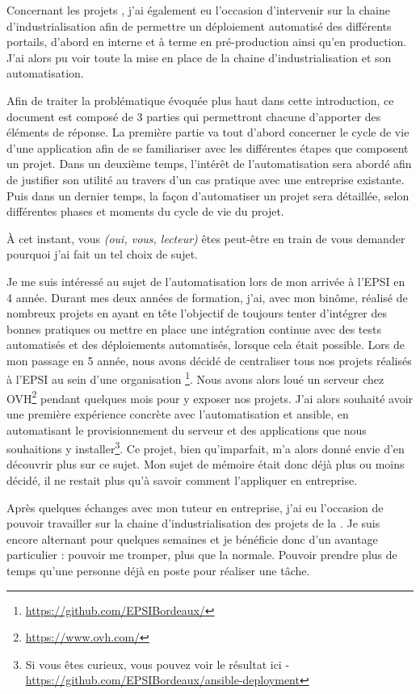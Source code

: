Concernant les projets \naq, j'ai également eu l'occasion d'intervenir sur la chaine d'industrialisation afin de permettre un déploiement automatisé des différents portails, d'abord en interne et à terme en pré-production ainsi qu'en production. J'ai alors pu voir toute la mise en place de la chaine d'industrialisation et son automatisation.

Afin de traiter la problématique évoquée plus haut dans cette introduction, ce document est composé de 3 parties qui permettront chacune d'apporter des éléments de réponse. La première partie va tout d'abord concerner le cycle de vie d'une application afin de se familiariser avec les différentes étapes que composent un projet. Dans un deuxième temps, l'intérêt de l'automatisation sera abordé afin de justifier son utilité au travers d'un cas pratique avec une entreprise existante. Puis dans un dernier temps, la façon d'automatiser un projet sera détaillée, selon différentes phases et moments du cycle de vie du projet.

À cet instant, vous \emph{(oui, vous, lecteur)} êtes peut-être en train de vous demander pourquoi j'ai fait un tel choix de sujet. 

Je me suis intéressé au sujet de l'automatisation lors de mon arrivée à l'EPSI en 4 année. Durant mes deux années de formation, j'ai, avec mon binôme, réalisé de nombreux projets en ayant en tête l'objectif de toujours tenter d'intégrer des bonnes pratiques ou mettre en place une intégration continue avec des tests automatisés et des déploiements automatisés, lorsque cela était possible. Lors de mon passage en 5 année, nous avons décidé de centraliser tous nos projets réalisés à l'EPSI au sein d'une organisation \github\footnote{\url{https://github.com/EPSIBordeaux/}}. Nous avons alors loué un serveur chez OVH\footnote{\url{https://www.ovh.com/}} pendant quelques mois pour y exposer nos projets. J'ai alors souhaité avoir une première expérience concrète avec l'automatisation et ansible, en automatisant le provisionnement du serveur et des applications que nous souhaitions y installer\footnote{Si vous êtes curieux, vous pouvez voir le résultat ici - \url{https://github.com/EPSIBordeaux/ansible-deployment}}. Ce projet, bien qu'imparfait, m'a alors donné envie d'en découvrir plus sur ce sujet. Mon sujet de mémoire était donc déjà plus ou moins décidé, il ne restait plus qu'à savoir comment l'appliquer en entreprise.

Après quelques échanges avec mon tuteur en entreprise, j'ai eu l'occasion de pouvoir travailler sur la chaine d'industrialisation des projets de la \naq. Je suis encore alternant pour quelques semaines et je bénéficie donc d'un avantage particulier : pouvoir me tromper, plus que la normale. Pouvoir prendre plus de temps qu'une personne déjà en poste pour réaliser une tâche.

